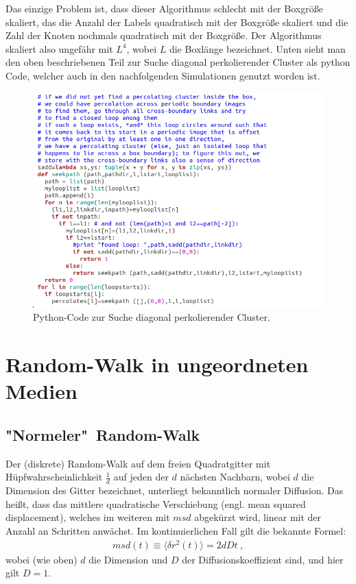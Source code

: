 \documentclass[a4paper, 12pt]{report}
\begin{document}
\noindent Das einzige Problem ist, dass dieser Algorithmus schlecht mit der Boxgröße skaliert, das die Anzahl der Labels quadratisch mit der Boxgröße skaliert und die Zahl der Knoten nochmals quadratisch mit der Boxgröße. Der Algorithmus skaliert also ungefähr mit $L^4$, wobei $L$ die Boxlänge bezeichnet. Unten sieht man den oben beschriebenen Teil zur Suche diagonal perkolierender Cluster als python Code, welcher auch in den nachfolgenden Simulationen genutzt worden ist.

\begin{figure}[h!]
	\centering
	\includegraphics[scale=0.9]{diagcode.png}
	\caption{Python-Code zur Suche diagonal perkolierender Cluster.}
\end{figure}

\clearpage

\section{Random-Walk in ungeordneten Medien}

\subsection{"Normeler"\ Random-Walk}
Der (diskrete) Random-Walk auf dem freien Quadratgitter mit Hüpfwahrscheinlichkeit $\frac{1}{d}$ auf jeden der $d$ nächsten Nachbarn, wobei $d$ die Dimension des Gitter bezeichnet, unterliegt bekanntlich normaler Diffusion. Das heißt, dass das mittlere quadratische Verschiebung (engl. mean squared displacement), welches im weiteren mit $msd$ abgekürzt wird, linear mit der Anzahl an Schritten anwächst. Im kontinuierlichen Fall gilt die bekannte Formel:
\begin{align*}
msd(t)\equiv \langle \delta r^2 (t) \rangle =2dDt\ ,
\end{align*}
wobei (wie oben) $d$ die Dimension und $D$ der Diffusionskoeffizient sind, und hier gilt $D=1$.
\end{document}
